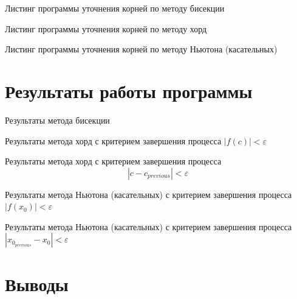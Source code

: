 Листинг программы уточнения корней по методу бисекции
\lstset{inputencoding=utf8, extendedchars=\true}


Листинг программы уточнения корней по методу хорд
\lstset{inputencoding=utf8, extendedchars=\true}


Листинг программы уточнения корней по методу Ньютона (касательных)
\lstset{inputencoding=utf8, extendedchars=\true}


\chapter{Результаты работы программы}

Результаты метода бисекции
\lstset{inputencoding=utf8, extendedchars=\true}


Результаты метода хорд с критерием завершения процесса $ \left| f \left( c \right) \right| < \varepsilon $
\lstset{inputencoding=utf8, extendedchars=\true}


Результаты метода хорд с критерием завершения процесса
$$\left| c - c_{previous} \right| < \varepsilon $$
\lstset{inputencoding=utf8, extendedchars=\true}


Результаты метода Ньютона (касательных) с критерием завершения процесса $ \left| f \left( x_0 \right) \right| < \varepsilon $
\lstset{inputencoding=utf8, extendedchars=\true}


Результаты метода Ньютона (касательных) с критерием завершения процесса $ \left| x_{0_{previous}} - x_0 \right| < \varepsilon $
\lstset{inputencoding=utf8, extendedchars=\true}


\chapter*{Выводы}

